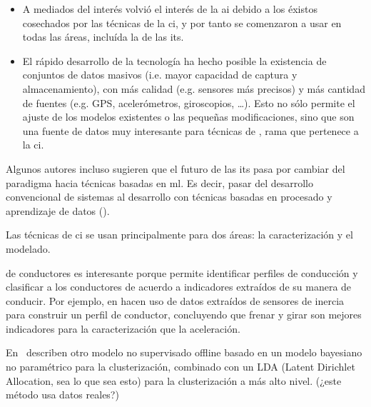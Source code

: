 \begin{itemize}
	\item A mediados del interés volvió el interés de la \gls{ai} debido a los éxistos cosechados por las técnicas de la \gls{ci}, y por tanto se comenzaron a usar en todas las áreas, incluída la de las its.
	\item El rápido desarrollo de la tecnología ha hecho posible la existencia de conjuntos de datos masivos (i.e. mayor capacidad de captura y almacenamiento), con más calidad (e.g. sensores más precisos) y más cantidad de fuentes (e.g. GPS, acelerómetros, giroscopios, \ldots). Esto no sólo permite el ajuste de los modelos existentes o las pequeñas modificaciones, sino que son una fuente de datos muy interesante para técnicas de , rama que pertenece a la \gls{ci}.
\end{itemize}

Algunos autores incluso sugieren que el futuro de las \gls{its} pasa por cambiar del paradigma hacia técnicas basadas en \gls{ml}. Es decir, pasar del desarrollo convencional de sistemas al desarrollo con técnicas basadas en procesado y aprendizaje de datos (\cite{Zhang2011}).

Las técnicas de \gls{ci} se usan principalmente para dos áreas: la caracterización y el modelado.

 de conductores es interesante porque permite identificar perfiles de conducción y clasificar a los conductores de acuerdo a indicadores extraídos de su manera de conducir. Por ejemplo, en \cite{van2013driver} hacen uso de datos extraídos de sensores de inercia para construir un perfil de conductor, concluyendo que frenar y girar son mejores indicadores para la caracterización que la aceleración.

En~\cite{bando2013unsupervised} describen otro modelo no supervisado offline basado en un modelo bayesiano no paramétrico para la clusterización, combinado con un LDA (Latent Dirichlet Allocation, sea lo que sea esto) para la clusterización a más alto nivel. (\TODO ¿este método usa datos reales?)

